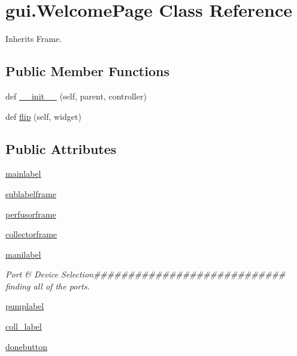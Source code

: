 \hypertarget{classgui_1_1_welcome_page}{}\section{gui.\+Welcome\+Page Class Reference}
\label{classgui_1_1_welcome_page}


Inherits Frame.

\subsection*{Public Member Functions}
\begin{DoxyCompactItemize}
\item 
def \mbox{\hyperlink{classgui_1_1_welcome_page_ad76f3aa5300f247046acdc4a54caf51b}{\+\_\+\+\_\+init\+\_\+\+\_\+}} (self, parent, controller)
\item 
def \mbox{\hyperlink{classgui_1_1_welcome_page_a3544802d544b577d46a633649ba3212b}{flip}} (self, widget)
\end{DoxyCompactItemize}
\subsection*{Public Attributes}
\begin{DoxyCompactItemize}
\item 
\mbox{\hyperlink{classgui_1_1_welcome_page_a5586a2ff4e087c2d72539f90a6bade8b}{mainlabel}}
\item 
\mbox{\hyperlink{classgui_1_1_welcome_page_a80e84cfdf7527c98d14573a143b6f0fd}{sublabelframe}}
\item 
\mbox{\hyperlink{classgui_1_1_welcome_page_acf22ea45b4f78ec45bcf83f9c3d32c01}{perfusorframe}}
\item 
\mbox{\hyperlink{classgui_1_1_welcome_page_a919dea50fcd83b99c88196268224a173}{collectorframe}}
\item 
\mbox{\hyperlink{classgui_1_1_welcome_page_ac473cc6367d751b57d827bee6b081fe1}{manilabel}}
\begin{DoxyCompactList}\small\item\em Port \& Device Selection\#\#\#\#\#\#\#\#\#\#\#\#\#\#\#\#\#\#\#\#\#\#\#\#\#\#\#\# finding all of the ports. \end{DoxyCompactList}\item 
\mbox{\hyperlink{classgui_1_1_welcome_page_a750ef6fb7d0bd37635b2dd711b187067}{pumplabel}}
\item 
\mbox{\hyperlink{classgui_1_1_welcome_page_a8a8f59dabb5188fbe1a0f6ea21933725}{coll\+\_\+label}}
\item 
\mbox{\hyperlink{classgui_1_1_welcome_page_a2d18a0f85a5af10a25e877f312ecdb97}{donebutton}}
\end{DoxyCompactItemize}


